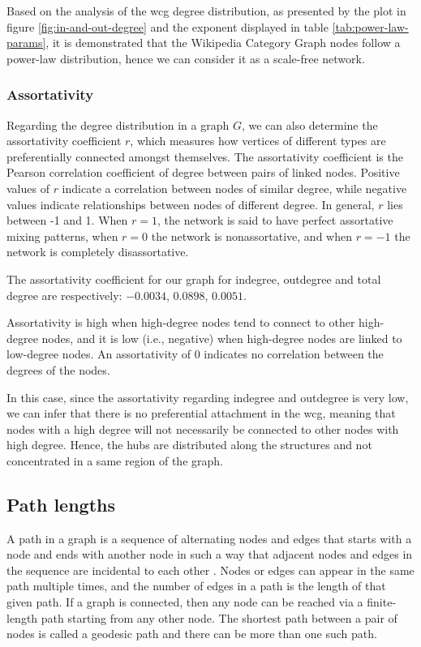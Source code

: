 Based on the analysis of the \gls{wcg} degree distribution, as presented by the plot in figure \ref{fig:in-and-out-degree} and the exponent displayed in table \ref{tab:power-law-params}, it is demonstrated that the Wikipedia Category Graph nodes follow a power-law distribution, hence we can consider it as a scale-free network.  

\subsubsection{\hspace*{3pt} Assortativity}

Regarding the degree distribution in a graph $G$, we can also determine the assortativity coefficient $r$, which measures how vertices of different types are preferentially connected amongst themselves. The assortativity coefficient \cite{newman2003mixing} is the Pearson correlation coefficient of degree between pairs of linked nodes. Positive values of $r$ indicate a correlation between nodes of similar degree, while negative values indicate relationships between nodes of different degree. In general, $r$ lies between -1 and 1. When $r = 1$, the network is said to have perfect assortative mixing patterns, when $r = 0$ the network is non\-assortative, and when  $r=-1$ the network is completely disassortative.

The assortativity coefficient for our graph for indegree, outdegree and total degree are  respectively: 
$-0.0034$, $0.0898$, $0.0051$. 

Assortativity is high when high-degree nodes tend to connect to other high-degree nodes, and it is low (i.e., negative) when high-degree nodes are linked to low-degree nodes. An assortativity of 0 indicates no correlation between the degrees of the nodes.

In this case, since the assortativity regarding indegree and outdegree is very low, we can infer that there is no preferential attachment in the \gls{wcg}, meaning that nodes with a high degree will not necessarily be connected to other nodes with high degree.  Hence, the hubs are distributed along the structures and not concentrated in a same region of the graph.


\subsection{\hspace*{3pt} Path lengths}

A path in a graph is a sequence of alternating nodes and edges that starts with a node and ends with another node in such a way that adjacent nodes and edges in the sequence are incidental to each other \cite{newman2010networks}. Nodes or edges can appear in the same path multiple times, and the number of edges in a path is the length of that given path. If a graph is connected, then any node can be reached via a finite-length path starting from any other node. The shortest path between a pair of nodes is called a geodesic path and there can be more than one such path.

